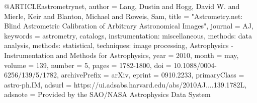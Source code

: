 
@ARTICLE{astrometrynet,
       author = {{Lang}, Dustin and {Hogg}, David W. and {Mierle}, Keir and {Blanton}, Michael and {Roweis}, Sam},
        title = "{Astrometry.net: Blind Astrometric Calibration of Arbitrary Astronomical Images}",
      journal = {AJ},
     keywords = {astrometry, catalogs, instrumentation: miscellaneous, methods: data analysis, methods: statistical, techniques: image processing, Astrophysics - Instrumentation and Methods for Astrophysics},
         year = 2010,
        month = may,
       volume = {139},
       number = {5},
        pages = {1782-1800},
          doi = {10.1088/0004-6256/139/5/1782},
archivePrefix = {arXiv},
       eprint = {0910.2233},
 primaryClass = {astro-ph.IM},
       adsurl = {https://ui.adsabs.harvard.edu/abs/2010AJ....139.1782L},
      adsnote = {Provided by the SAO/NASA Astrophysics Data System}
}
